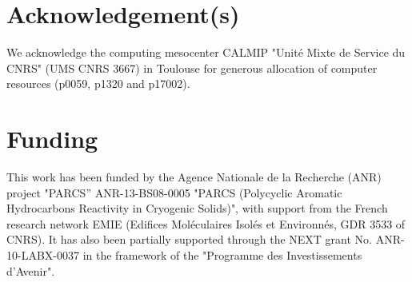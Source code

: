 \documentclass[]{interact}
\theoremstyle{plain}%
\theoremstyle{definition}
\theoremstyle{remark}
\begin{document}
\section*{Acknowledgement(s)}

We acknowledge the computing mesocenter CALMIP "Unit\'e Mixte de Service du CNRS" (UMS CNRS 3667)  in Toulouse for generous allocation of computer resources (p0059, p1320 and p17002). 



\section*{Funding}

This work has been funded by the Agence Nationale de la Recherche (ANR) project "PARCS'' ANR-13-BS08-0005 "PARCS (Polycyclic Aromatic Hydrocarbons Reactivity in Cryogenic Solids)", with support from the French research network EMIE (Edifices Mol\'{e}culaires Isol\'{e}s et Environn\'{e}s, GDR 3533 of CNRS). It has also been partially
supported through the NEXT grant No. ANR-10-LABX-0037 in the framework of the "Programme des Investissements d'Avenir". 





\end{document}
